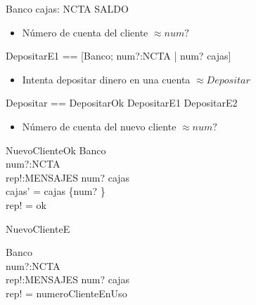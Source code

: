 \begin{schema}{Banco}
cajas: NCTA \pfun SALDO
\end{schema}

\begin{itemize}
  \item Número de cuenta del cliente $\approx num?$ 
\end{itemize}


\begin{zed}
DepositarE1 == [\Xi Banco; num?:NCTA | num? \notin \dom cajas]
\end{zed}


\begin{itemize}
  \item Intenta depositar dinero en una cuenta $\approx Depositar$ 
\end{itemize}

\begin{zed}
Depositar == DepositarOk \lor DepositarE1 \lor DepositarE2
\end{zed}

\begin{itemize}
  \item Número de cuenta del nuevo cliente $\approx num?$ 
\end{itemize}

\begin{schema}{NuevoClienteOk}
\Delta Banco \\
num?:NCTA \\
rep!:MENSAJES
\where
num? \notin \dom cajas \\
cajas' = cajas \cup \{num? \} \\
rep! = ok
\end{schema}

\begin{schema}{NuevoClienteE}

\Xi Banco \\
num?:NCTA \\
rep!:MENSAJES
\where
num? \in \dom cajas \\
rep! = numeroClienteEnUso
\end{schema}

